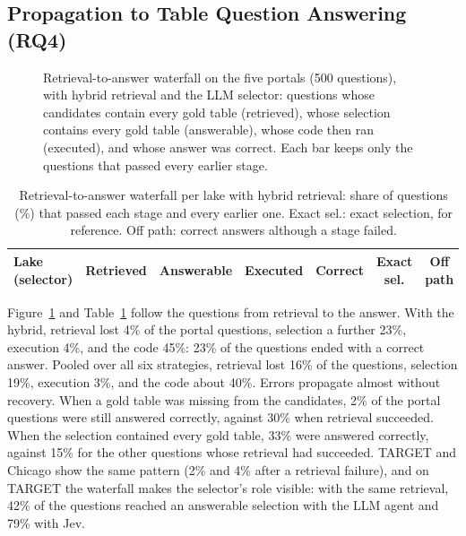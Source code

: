 \subsection{Propagation to Table Question Answering (RQ4)}
\label{sec:results-propagation}

\begin{figure}[t]
\centering
\caption{Retrieval-to-answer waterfall on the five portals (500 questions),
with hybrid retrieval and the LLM selector: questions whose candidates contain
every gold table (retrieved), whose selection contains every gold table
(answerable), whose code then ran (executed), and whose answer was correct.
Each bar keeps only the questions that passed every earlier stage.}
\label{fig:waterfall}
\end{figure}

\begin{table}[t]
\caption{Retrieval-to-answer waterfall per lake with hybrid retrieval: share of
questions (\%) that passed each stage and every earlier one. Exact sel.: exact
selection, for reference. Off path: correct answers although a stage failed.}
\label{tab:waterfall}
\centering
\small
\begin{tabular}{l|cccc|cc}
\hline
Lake (selector) & Retrieved & Answerable & Executed & Correct & Exact sel. & Off path \\
\hline
\hline
\end{tabular}
\end{table}

Figure~\ref{fig:waterfall} and Table~\ref{tab:waterfall} follow the questions
from retrieval to the answer. With the hybrid, retrieval lost 4\% of the portal
questions, selection a further 23\%, execution 4\%, and the code 45\%: 23\%
of the questions ended with a correct answer. Pooled over all six strategies,
retrieval lost 16\% of the questions, selection 19\%, execution 3\%, and the
code about 40\%.
Errors propagate almost without recovery. When a gold table was missing from
the candidates, 2\% of the portal questions were still answered correctly,
against 30\% when retrieval succeeded. When the selection contained every gold
table, 33\% were answered correctly, against 15\% for the other questions whose
retrieval had succeeded. TARGET and Chicago show the same pattern (2\% and 4\%
after a retrieval failure), and on TARGET the waterfall makes the selector's
role visible: with the same retrieval, 42\% of the questions reached an
answerable selection with the LLM agent and 79\% with Jev.

